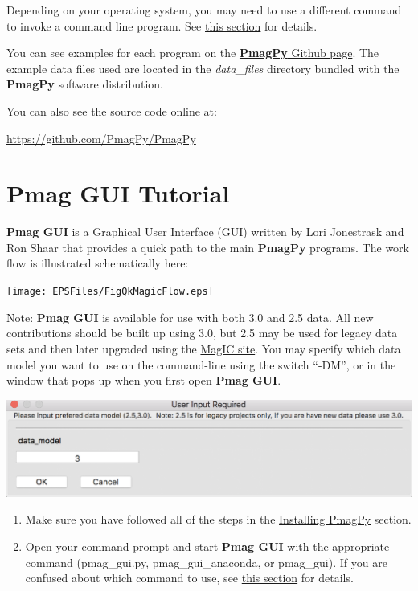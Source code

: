 \documentclass[11pt]{book}
\begin{document}
{{Depending on your operating system, you  may need to use a different command to invoke a command line program.  See \href{#which_command}{this section} for details.

You can see examples for each program on the \href{http://pmagpy.github.io/PmagPy-cli.html}{{\bf PmagPy} Github page}. The example data files used are located in the {\it data\_files} directory bundled with the {\bf PmagPy} software distribution.

You can also see the source code online at:


 \url{https://github.com/PmagPy/PmagPy}


\chapter{Pmag GUI Tutorial}
\label{chap:Pmag GUI}

{\bf Pmag GUI} is a Graphical User Interface (GUI) written by Lori Jonestrask and Ron Shaar  that provides a quick path to the main {\bf PmagPy} programs. The work flow is illustrated schematically here:

\texttt{[image: EPSFiles/FigQkMagicFlow.eps]}

Note: {\bf Pmag GUI} is available for use with both 3.0 and 2.5 data.  All new contributions should be built up using 3.0, but 2.5 may be used for legacy data sets and then later upgraded using the \href{https://www.earthref.org/MagIC/upgrade}{MagIC site}.  You may specify which data model you want to use on the command-line using the switch ``-DM'', or in the window that pops up when you first open {\bf Pmag GUI}.

\includegraphics[width=6in]{EPSFiles/PmagGUI_choose_data_model.eps}

\begin{enumerate}
\item Make sure you have followed all of the steps in the \href{#quick_start}{Installing PmagPy} section.


\item Open your command prompt and start {\bf Pmag GUI} with the appropriate command (pmag\_gui.py, pmag\_gui\_anaconda, or pmag\_gui).  If you are confused about which command to use, see \href{#which_command}{this section} for details.


\end{enumerate}}}
\end{document}
